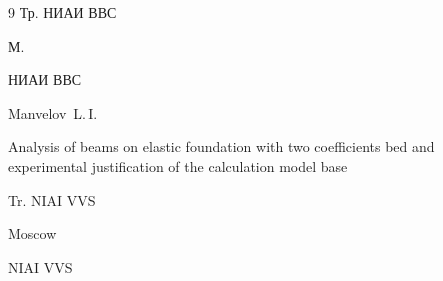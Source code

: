 \begin{thebibliography}{9}
\inbook Тр. НИАИ ВВС


\publaddr М.

\publ НИАИ ВВС



\misctransl

\by Manvelov~L.\,I.

\paper Analysis of beams on elastic foundation with two coefficients bed and experimental justification of the calculation model base

\inbook Tr. NIAI VVS 


\publaddr Moscow 

\publ NIAI VVS 











\end{thebibliography}



\noindent

\hskip6.5cm \thedate \par\noindent

\hskip6.5cm\therevdate





%


%






\makeengtitlem







 \newpage

%


%

%

